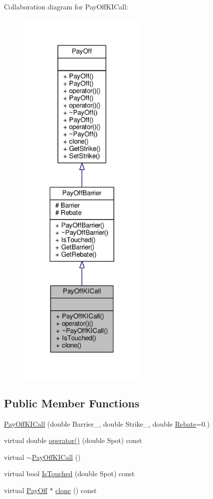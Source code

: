Collaboration diagram for Pay\+Off\+K\+I\+Call\+:
\nopagebreak
\begin{figure}[H]
\begin{center}
\leavevmode
\includegraphics[width=177pt]{classPayOffKICall__coll__graph}
\end{center}
\end{figure}
\subsection*{Public Member Functions}
\begin{DoxyCompactItemize}
\item 
\hyperlink{classPayOffKICall_ae9e4e8412e6c51e6642d0d9d77c7e644}{Pay\+Off\+K\+I\+Call} (double Barrier\+\_\+, double Strike\+\_\+, double \hyperlink{classPayOffBarrier_aca3ea631dcdb28a1df971b74774e41f8}{Rebate}=0.)
\item 
virtual double \hyperlink{classPayOffKICall_a4acdec35a77873ea44f529fad9a348d5}{operator()} (double Spot) const
\item 
virtual \hyperlink{classPayOffKICall_a94543d709558c055c9ab3ba6ae7b3f42}{$\sim$\+Pay\+Off\+K\+I\+Call} ()
\item 
virtual bool \hyperlink{classPayOffKICall_af16b41bce04b47515f543d2da2c449a9}{Is\+Touched} (double Spot) const
\item 
virtual \hyperlink{classPayOff}{Pay\+Off} $\ast$ \hyperlink{classPayOffKICall_a88d8fbd976608d0a4da969e638a261b4}{clone} () const
\end{DoxyCompactItemize}
